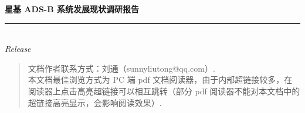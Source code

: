 
\thispagestyle{empty}

\noindent\begin{minipage}{\textwidth}
\raggedleft
{\huge \bfseries 星基 ADS-B 系统发展现状调研报告}
\noindent\rule[-1ex]{\textwidth}{5pt}\\[2.5ex]
\hfill\emph{\Large Release }
\end{minipage}

\noindent{}


\begin{quote}\footnotesize
  文档作者联系方式：刘通（sunnyliutong@qq.com）. \\
  本文档最佳浏览方式为 PC 端 pdf 文档阅读器，由于内部超链接较多，在阅读器上点击高亮超链接可以相互跳转（部分 pdf 阅读器不能对本文档中的超链接高亮显示，会影响阅读效果）.
\end{quote}